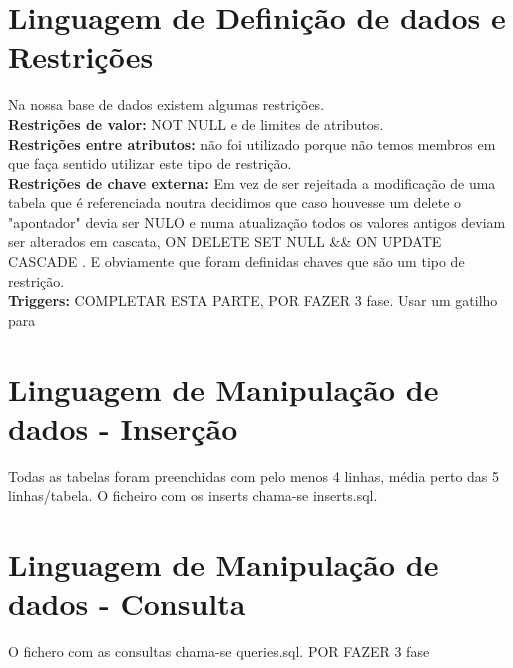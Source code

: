 \documentclass[a4paper]{article}
\begin{document}
\section{Linguagem de Definição de dados e Restrições}
Na nossa base de dados existem algumas restrições. \\
\textbf{Restrições de valor:} NOT NULL e de limites de atributos. \\
\textbf{Restrições entre atributos:} não foi utilizado porque não temos membros em que faça sentido utilizar este tipo de restrição. \\
\textbf{Restrições de chave externa:} Em vez de ser rejeitada a modificação de uma tabela que é referenciada noutra decidimos que caso houvesse um delete o "apontador" devia ser NULO e numa atualização todos os valores antigos deviam ser alterados em cascata, ON DELETE SET NULL \&\& ON UPDATE CASCADE .
E obviamente que foram definidas chaves que são um tipo de restrição. \\
\textbf{Triggers:} COMPLETAR ESTA PARTE, POR FAZER 3 fase. Usar um gatilho para
\section{Linguagem de Manipulação de dados - Inserção}
Todas as tabelas foram preenchidas com pelo menos 4 linhas, média perto das 5 linhas/tabela. O ficheiro com os inserts chama-se inserts.sql.

\section{Linguagem de Manipulação de dados - Consulta}
O fichero com as consultas chama-se queries.sql.
POR FAZER 3 fase


\end{document}
